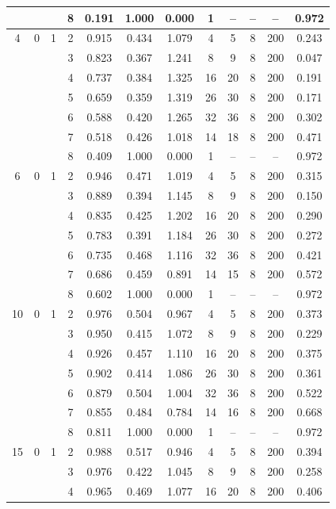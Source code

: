 \documentclass[12pt]{article}
\begin{document}
\begin{table}
\begin{ruledtabular}
\begin{tabular}{cccccccccccc}
 & &  & 8 & 0.191 & 1.000 & 0.000 & 1 & -- & -- & -- & 0.972 \\
\hline
4 & 0 & 1 & 2 & 0.915 & 0.434 & 1.079 & 4 & 5 & 8 & 200 & 0.243 \\
 & &  & 3 & 0.823 & 0.367 & 1.241 & 8 & 9 & 8 & 200 & 0.047 \\
 & &  & 4 & 0.737 & 0.384 & 1.325 & 16 & 20 & 8 & 200 & 0.191 \\
 & &  & 5 & 0.659 & 0.359 & 1.319 & 26 & 30 & 8 & 200 & 0.171 \\
 & &  & 6 & 0.588 & 0.420 & 1.265 & 32 & 36 & 8 & 200 & 0.302 \\
 & &  & 7 & 0.518 & 0.426 & 1.018 & 14 & 18 & 8 & 200 & 0.471 \\
 & &  & 8 & 0.409 & 1.000 & 0.000 & 1 & -- & -- & -- & 0.972 \\
\hline
6 & 0 & 1 & 2 & 0.946 & 0.471 & 1.019 & 4 & 5 & 8 & 200 & 0.315 \\
 & &  & 3 & 0.889 & 0.394 & 1.145 & 8 & 9 & 8 & 200 & 0.150 \\
 & &  & 4 & 0.835 & 0.425 & 1.202 & 16 & 20 & 8 & 200 & 0.290 \\
 & &  & 5 & 0.783 & 0.391 & 1.184 & 26 & 30 & 8 & 200 & 0.272 \\
 & &  & 6 & 0.735 & 0.468 & 1.116 & 32 & 36 & 8 & 200 & 0.421 \\
 & &  & 7 & 0.686 & 0.459 & 0.891 & 14 & 15 & 8 & 200 & 0.572 \\
 & &  & 8 & 0.602 & 1.000 & 0.000 & 1 & -- & -- & -- & 0.972 \\
\hline
10 & 0 & 1 & 2 & 0.976 & 0.504 & 0.967 & 4 & 5 & 8 & 200 & 0.373 \\
 & &  & 3 & 0.950 & 0.415 & 1.072 & 8 & 9 & 8 & 200 & 0.229 \\
 & &  & 4 & 0.926 & 0.457 & 1.110 & 16 & 20 & 8 & 200 & 0.375 \\
 & &  & 5 & 0.902 & 0.414 & 1.086 & 26 & 30 & 8 & 200 & 0.361 \\
 & &  & 6 & 0.879 & 0.504 & 1.004 & 32 & 36 & 8 & 200 & 0.522 \\
 & &  & 7 & 0.855 & 0.484 & 0.784 & 14 & 16 & 8 & 200 & 0.668 \\
 & &  & 8 & 0.811 & 1.000 & 0.000 & 1 & -- & -- & -- & 0.972 \\
\hline
15 & 0 & 1 & 2 & 0.988 & 0.517 & 0.946 & 4 & 5 & 8 & 200 & 0.394 \\
 & &  & 3 & 0.976 & 0.422 & 1.045 & 8 & 9 & 8 & 200 & 0.258 \\
 & &  & 4 & 0.965 & 0.469 & 1.077 & 16 & 20 & 8 & 200 & 0.406 \\

\end{tabular}
\end{ruledtabular}
\end{table}
\end{document}
